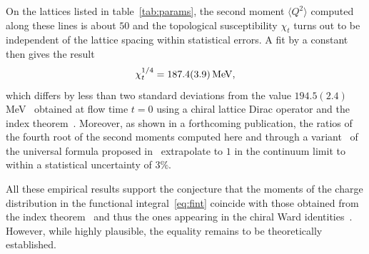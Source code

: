 On the lattices listed in table~\ref{tab:params},
the second moment $\langle Q^2\rangle$
computed along these lines is about $50$
and the topological susceptibility $\chi_t$ turns out
to be independent of the lattice spacing
within statistical errors. A fit by a constant
then gives the result
\begin{equation}
   \chi_t^{1/4}=187.4(3.9)\,\mathrm{MeV},
   \label{eq:chit}
\end{equation}
which differs
by less than two standard deviations
from the value $194.5(2.4)$ MeV~\cite{ChiGW}
obtained at flow time $t=0$
using a chiral lattice Dirac operator and
the index theorem~\cite{IndThm}.
Moreover, as shown in a forthcoming publication,
the ratios of the fourth root of the second moments computed here
and through a variant~\cite{ChiProj} of
the universal formula proposed in~\cite{ChiInd} extrapolate to $1$ in the continuum limit
to within a statistical uncertainty of $3\%$.

All these empirical results support the conjecture
that the moments of
the charge distribution in the functional integral~\eqref{eq:fint}
coincide with those obtained from the index theorem~\cite{IndThm,ChiGW,ChiInd,ChiProj}
and thus the
ones appearing in
the chiral Ward identities~\cite{ChiWI,ChiWII}.
However, while highly plausible, the equality remains to be
theoretically established.

